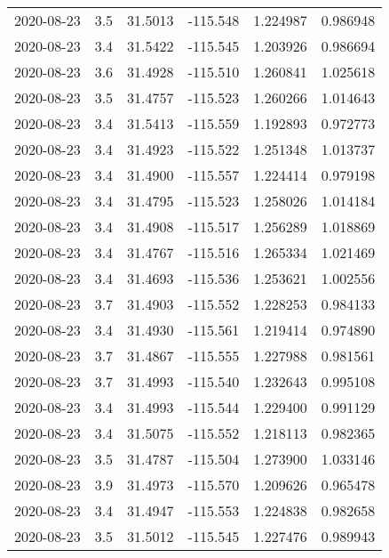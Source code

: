 \begin{tabular}{lrrrrr}
2020-08-23 &       3.5 &  31.5013 &  -115.548 &         1.224987 &         0.986948 \\
2020-08-23 &       3.4 &  31.5422 &  -115.545 &         1.203926 &         0.986694 \\
2020-08-23 &       3.6 &  31.4928 &  -115.510 &         1.260841 &         1.025618 \\
2020-08-23 &       3.5 &  31.4757 &  -115.523 &         1.260266 &         1.014643 \\
2020-08-23 &       3.4 &  31.5413 &  -115.559 &         1.192893 &         0.972773 \\
2020-08-23 &       3.4 &  31.4923 &  -115.522 &         1.251348 &         1.013737 \\
2020-08-23 &       3.4 &  31.4900 &  -115.557 &         1.224414 &         0.979198 \\
2020-08-23 &       3.4 &  31.4795 &  -115.523 &         1.258026 &         1.014184 \\
2020-08-23 &       3.4 &  31.4908 &  -115.517 &         1.256289 &         1.018869 \\
2020-08-23 &       3.4 &  31.4767 &  -115.516 &         1.265334 &         1.021469 \\
2020-08-23 &       3.4 &  31.4693 &  -115.536 &         1.253621 &         1.002556 \\
2020-08-23 &       3.7 &  31.4903 &  -115.552 &         1.228253 &         0.984133 \\
2020-08-23 &       3.4 &  31.4930 &  -115.561 &         1.219414 &         0.974890 \\
2020-08-23 &       3.7 &  31.4867 &  -115.555 &         1.227988 &         0.981561 \\
2020-08-23 &       3.7 &  31.4993 &  -115.540 &         1.232643 &         0.995108 \\
2020-08-23 &       3.4 &  31.4993 &  -115.544 &         1.229400 &         0.991129 \\
2020-08-23 &       3.4 &  31.5075 &  -115.552 &         1.218113 &         0.982365 \\
2020-08-23 &       3.5 &  31.4787 &  -115.504 &         1.273900 &         1.033146 \\
2020-08-23 &       3.9 &  31.4973 &  -115.570 &         1.209626 &         0.965478 \\
2020-08-23 &       3.4 &  31.4947 &  -115.553 &         1.224838 &         0.982658 \\
2020-08-23 &       3.5 &  31.5012 &  -115.545 &         1.227476 &         0.989943 \\

\end{tabular}
